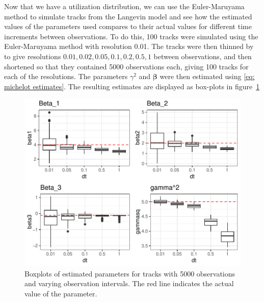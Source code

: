 Now that we have a utilization distribution, we can use the Euler-Maruyama method to simulate tracks from the Langevin model and see how the estimated values of the parameters used compares to their actual values for different time increments between observations. To do this, 100 tracks were simulated using the Euler-Maruyama method with resolution 0.01. The tracks were then thinned by to give resolutions $0.01, 0.02, 0.05, 0.1, 0.2, 0.5, 1$ between observations, and then shortened so that they contained 5000 observations each, giving 100 tracks for each of the resolutions. The parameters $\gamma^2$ and $\bm \beta$ were then estimated using \eqref{eq: michelot estimates}. The resulting estimates are displayed as box-plots in figure~\ref{fig:EM_thin_boxplot}


\begin{figure}[H]
    \centering
    \includegraphics[width=\linewidth]{Images/ch3/varying dt EM boxplot.pdf}
    \caption[Euler-Mauryama estimates]{Boxplots of estimated parameters for tracks with 5000 observations and varying observation intervals. The red line indicates the actual value of the parameter.}
    \label{fig:EM_thin_boxplot}
\end{figure}


